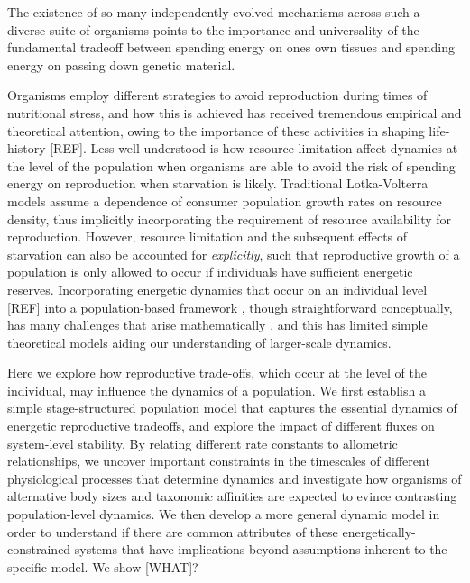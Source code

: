 \documentclass[12pt,english]{article}
\begin{document}
\begin{spacing}{1.9}
The existence of so many independently evolved mechanisms across such a diverse suite of organisms points to the importance and universality of the fundamental tradeoff between spending energy on ones own tissues and spending energy on passing down genetic material.

Organisms employ different strategies to avoid reproduction during times of nutritional stress, and how this is achieved has received tremendous empirical and theoretical attention, owing to the importance of these activities in shaping life-history [REF].
Less well understood is how resource limitation affect dynamics at the level of the population when organisms are able to avoid the risk of spending energy on reproduction when starvation is likely.
Traditional Lotka-Volterra models assume a dependence of consumer population growth rates on resource density, thus implicitly incorporating the requirement of resource availability for reproduction.
However, resource limitation and the subsequent effects of starvation can also be accounted for \emph{explicitly}, such that reproductive growth of a population is only allowed to occur if individuals have sufficient energetic reserves.
Incorporating energetic dynamics that occur on an individual level [REF] into a population-based framework \citep{Kooi2000,Sousa:2010ez}, though straightforward conceptually, has many challenges that arise mathematically \citep{Diekmann:2010da}, and this has limited simple theoretical models aiding our understanding of larger-scale dynamics.

Here we explore how reproductive trade-offs, which occur at the level of the individual, may influence the dynamics of a population.
We first establish a simple stage-structured population model that captures the essential dynamics of energetic reproductive tradeoffs, and explore the impact of different fluxes on system-level stability.
By relating different rate constants to allometric relationships, we uncover important constraints in the timescales of different physiological processes that determine dynamics and investigate how organisms of alternative body sizes and taxonomic affinities are expected to evince contrasting population-level dynamics.
We then develop a more general dynamic model in order to understand if there are common attributes of these energetically-constrained systems that have implications beyond assumptions inherent to the specific model.
We show [WHAT]?



\end{spacing}
\end{document}
